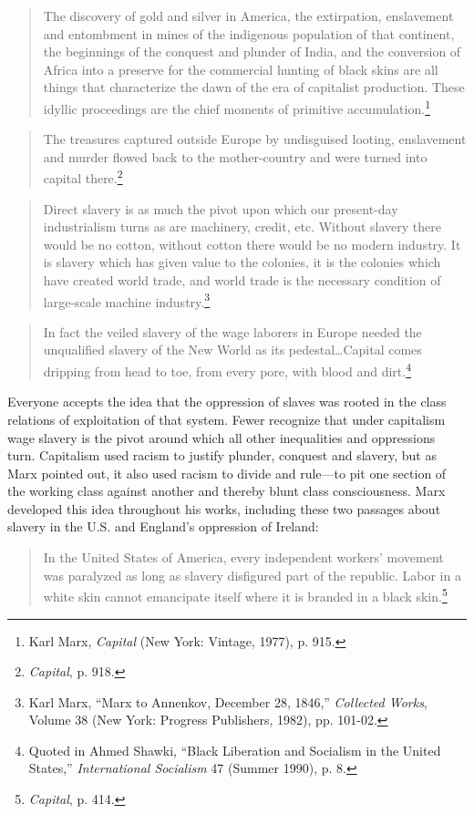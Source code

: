 \blockquote{The discovery of gold and silver in America, the extirpation, enslavement and entombment in mines of the indigenous population of that continent, the beginnings of the conquest and plunder of India, and the conversion of Africa into a preserve for the commercial hunting of black skins are all things that characterize the dawn of the era of capitalist production. These idyllic proceedings are the chief moments of primitive accumulation.\footnote{Karl Marx, \emph{Capital} (New York: Vintage, 1977), p. 915.}}

\blockquote{The treasures captured outside Europe by undisguised looting, enslavement and murder flowed back to the mother-country and were turned into capital there.\footnote{\emph{Capital}, p. 918.}}

\blockquote{Direct slavery is as much the pivot upon which our present-day industrialism turns as are machinery, credit, etc. Without slavery there would be no cotton, without cotton there would be no modern industry. It is slavery which has given value to the colonies, it is the colonies which have created world trade, and world trade is the necessary condition of large-scale machine industry.\footnote{Karl Marx, ``Marx to Annenkov, December 28, 1846,'' \emph{Collected Works}, Volume 38 (New York: Progress Publishers, 1982), pp. 101-02.}}

\blockquote{In fact the veiled slavery of the wage laborers in Europe needed the unqualified slavery of the New World as its pedestal\ldots Capital comes dripping from head to toe, from every pore, with blood and dirt.\footnote{Quoted in Ahmed Shawki, ``Black Liberation and Socialism in the United States,'' \emph{International Socialism} 47 (Summer 1990), p. 8.}}

Everyone accepts the idea that the oppression of slaves was rooted in the class relations of exploitation of that system. Fewer recognize that under capitalism wage slavery is the pivot around which all other inequalities and oppressions turn. Capitalism used racism to justify plunder, conquest and slavery, but as Marx pointed out, it also used racism to divide and rule---to pit one section of the working class against another and thereby blunt class consciousness. Marx developed this idea throughout his works, including these two passages about slavery in the U.S. and England's oppression of Ireland:

\blockquote{In the United States of America, every independent workers' movement was paralyzed as long as slavery disfigured part of the republic. Labor in a white skin cannot emancipate itself where it is branded in a black skin.\footnote{\emph{Capital}, p. 414.}}

